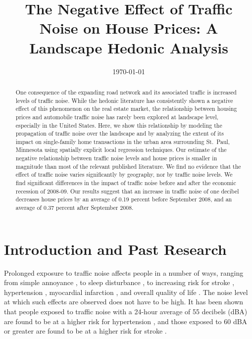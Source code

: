 \documentclass{article}\usepackage{graphicx, color}
\title{The Negative Effect of Traffic Noise on House Prices: A Landscape Hedonic Analysis}
\date{\today}
\begin{document}
\maketitle
\begin{singlespace}
\begin{abstract}
One consequence of the expanding road network and its associated traffic is increased levels of traffic noise.  While the hedonic literature has consistently shown a negative effect of this phenomenon on the real estate market, the relationship between housing prices and automobile traffic noise has rarely been explored at landscape level, especially in the United States. Here, we show this relationship by modeling the propagation of traffic noise over the landscape and by analyzing the extent of its impact on single-family home transactions in the urban area surrounding St.\ Paul, Minnesota using spatially explicit local regression techniques. Our estimate of the negative relationship between traffic noise levels and house prices is smaller in magnitude than most of the relevant published literature. We find no evidence that the effect of traffic noise varies significantly by geography, nor by traffic noise levels.  We find significant differences in the impact of traffic noise before and after the economic recession of 2008-09. Our results suggest that an increase in traffic noise of one decibel decreases house prices by an average of 0.19 percent before September 2008, and an average of 0.37 percent after September 2008.
\end{abstract}
\end{singlespace}

\section{Introduction and Past Research}\label{sec:lit}
Prolonged exposure to traffic noise affects people in a number of ways, ranging from simple annoyance \citep{Miedema2001, Ouis2001, Ohrstrom2007, DeKluizenaar2013, Weinhold2013}, to sleep disturbance , to increasing risk for stroke \citep{Sorensen2011}, hypertension \citep{Jarup2008, Bodin2009}, myocardial infarction \citep{Babisch2005}, and overall quality of life \citep{Shepherd2013}. The noise level at which such effects are observed does not have to be high.  It has been shown that people exposed to traffic noise with a 24-hour average of 55 decibels (dBA) are found to be at a higher risk for hypertension \citep{Barregard2009, Bodin2009}, and those exposed to 60 dBA or greater are found to be at a higher risk for stroke \citep{Sorensen2011}.  
\end{document}
